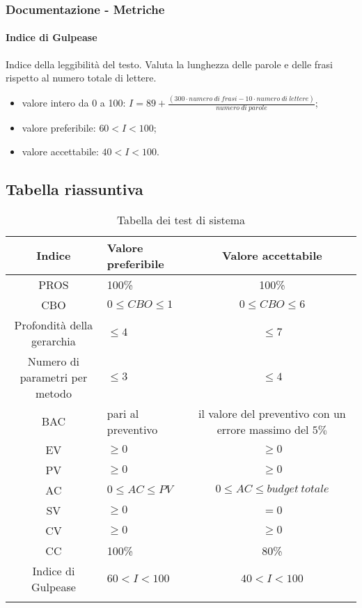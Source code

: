 		\subsubsection{Documentazione - Metriche}
		\paragraph{Indice di Gulpease}
		Indice della leggibilità del testo. Valuta la lunghezza delle parole e delle frasi rispetto al numero totale di lettere.
		\begin{itemize}
		\item valore intero da 0 a 100: $I = 89 + \frac{(300 \cdot numero \ di \ frasi - 10 \cdot numero \ di \ lettere)}{numero \ di \ parole}$;
		\item valore preferibile: $60 < I < 100$;
		\item valore accettabile: $40 < I < 100$.
		\end{itemize}
		
	\subsection{Tabella riassuntiva}
		\begin{center}
		\begin{longtable}{|c|p{10cm}|c|}
			\hline
			\rowcolor{lighter-grayer}
			\textbf{Indice} & \textbf{Valore preferibile} & \textbf{Valore accettabile}  \\ 
						
			\hline
			\endhead
			
			\hline
			PROS & 100\% & 100\% \\
			\hline
			CBO & $0 \leq CBO \leq 1$ & $0 \leq CBO \leq 6$ \\
			\hline
			Profondità della gerarchia & $\leq 4$ & $\leq 7$ \\
			\hline
			Numero di parametri per metodo & $\leq 3$ & $\leq 4$ \\
			\hline
			BAC & pari al preventivo & il valore del preventivo con un errore massimo del $5\%$ \\
			\hline
			EV & $\geq 0$ & $\geq 0$ \\
			\hline
			PV & $\geq 0$ & $\geq 0$ \\			
			\hline
			AC & $0 \leq AC \le PV$ & $0 \leq AC \leq budget \ totale$ \\			
			\hline
			SV & $\ge 0$ & $= 0$ \\			
			\hline
			CV & $\ge 0$ & $\geq 0$ \\		
			\hline
			CC & 100\% & 80\% \\
			\hline
			Indice di Gulpease & $60 < I < 100$ & $40 < I < 100$ \\
			\hline
				
			\hiderowcolors
			\caption{Tabella dei test di sistema}		
		\end{longtable}	
	\end{center}
